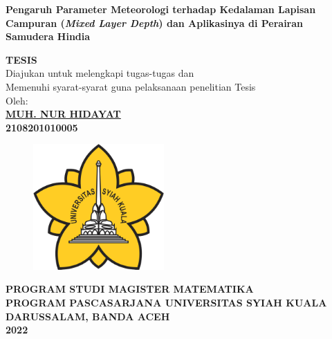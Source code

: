 \begin{spacing}{1}
	\begin{center}
		{\Large\textbf{Pengaruh Parameter Meteorologi terhadap Kedalaman Lapisan Campuran (\textit{Mixed Layer Depth}) dan Aplikasinya di Perairan Samudera Hindia}}\\[1.0cm]
	\end{center}
	\vspace*{0.8cm} 
	
	\begin{center}
		
		\large{\textbf{TESIS}}
		\\\vspace*{1.8cm}    
		\normalsize{Diajukan untuk melengkapi tugas-tugas dan \\
			Memenuhi syarat-syarat guna pelaksanaan penelitian Tesis}\\[1.5cm]
		\vspace*{1cm}  
		{\large Oleh:}\\
		\vspace*{1cm}       
		\large{\textbf{\underline{MUH. NUR HIDAYAT}}}
		\\\large{\textbf{2108201010005}} 
	\end{center}\vspace*{1cm}   
	
	\begin{figure}[h]
		\centering
		\includegraphics[width=5cm]{contents/USK} %
	\end{figure}
	\vspace*{1.5cm}   
	
	\begin{center}
		\textbf{PROGRAM STUDI MAGISTER MATEMATIKA \\
			PROGRAM PASCASARJANA UNIVERSITAS SYIAH KUALA\\
			DARUSSALAM, BANDA ACEH\\
			2022}
	\end{center}
	\thispagestyle{empty}
\end{spacing}